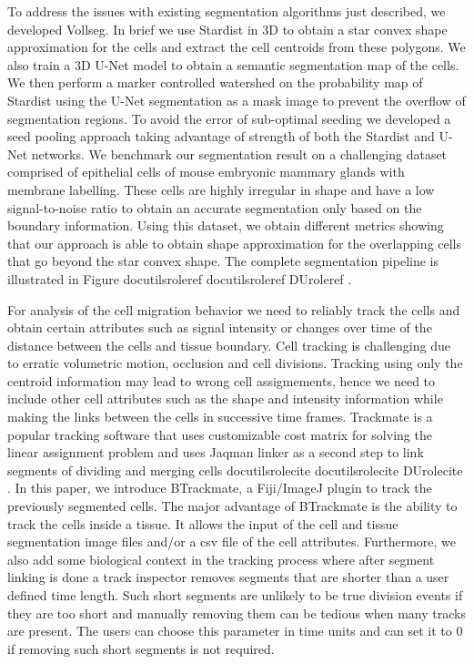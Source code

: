 \documentclass[letterpaper,compsoc,twoside,onecolumn]{IEEEtran}
\providecommand*{\DUrole}[2]{%
  \ifcsname docutilsrole#1\endcsname%
    \csname docutilsrole#1\endcsname{#2}%
  \else
    \csname DUrole#1\endcsname{#2}%
  \fi%
}
\begin{document}
To address the issues with existing segmentation algorithms just described, we developed Vollseg. In brief we use Stardist in 3D to obtain a star convex shape approximation for the cells and extract the cell centroids from these polygons. We also train a 3D U-Net model to obtain a semantic segmentation map of the cells. We then perform a marker controlled watershed on the probability map of Stardist using the U-Net segmentation as a mask image to prevent the overflow of segmentation regions. To avoid the error of sub-optimal seeding we developed a seed pooling approach taking advantage of strength of both the Stardist and U-Net networks. We benchmark our segmentation result on a challenging dataset comprised of epithelial cells of mouse embryonic mammary glands with membrane labelling. These cells are highly irregular in shape and have a low signal-to-noise ratio to obtain an accurate segmentation only based on the boundary information. Using this dataset, we obtain different metrics showing that our approach is able to obtain shape approximation for the overlapping cells that go beyond the star convex shape. The complete segmentation pipeline is illustrated in Figure \DUrole{ref}{algorithm}.

For analysis of the cell migration behavior we need to reliably track the cells and obtain certain attributes such as signal intensity or changes over time of the distance between the cells and tissue boundary. Cell tracking is challenging due to erratic volumetric motion, occlusion and cell divisions. Tracking using only the centroid information may lead to wrong cell assigmements, hence we need to include other cell attributes such as the shape and intensity information while making the links between the cells in successive time frames. Trackmate is a popular tracking software that uses customizable cost matrix for solving the linear assignment problem and uses Jaqman linker as a second step to link segments of dividing and merging cells \DUrole{cite}{Tinevez2017}. In this paper, we introduce BTrackmate, a Fiji/ImageJ plugin to track the previously segmented cells. The major advantage of BTrackmate is the ability to track the cells inside a tissue. It allows the input of the cell and tissue segmentation image files and/or a csv file of the cell attributes. Furthermore, we also add some biological context in the tracking process where after segment linking is done a track inspector removes segments that are shorter than a user defined time length. Such short segments are unlikely to be true division events if they are too short and manually removing them can be tedious when many tracks are present. The users can choose this parameter in time units and can set it to 0 if removing such short segments is not required.
\end{document}
